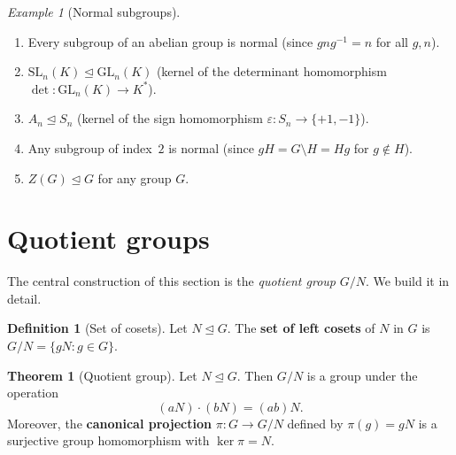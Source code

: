 \documentclass[12pt,a4paper,openany]{book}
\theoremstyle{definition}
\newtheorem{definition}{Definition}[chapter]
\newtheorem{theorem}{Theorem}[chapter]
\theoremstyle{remark}
\newtheorem{example}{Example}[chapter]
\begin{document}
\begin{example}[Normal subgroups]
\label{ex:normal-subgroups}
\begin{enumerate}[label=(\roman*)]
  \item Every subgroup of an abelian group is normal (since $gng^{-1}=n$
    for all $g,n$).
  \item $\text{SL}_n(K)\trianglelefteq\text{GL}_n(K)$ (kernel of the
    determinant homomorphism $\det\colon\text{GL}_n(K)\to K^*$).
  \item $A_n\trianglelefteq S_n$ (kernel of the sign homomorphism
    $\varepsilon\colon S_n\to\{+1,-1\}$).
  \item Any subgroup of index~$2$ is normal (since $gH=G\setminus H=Hg$
    for $g\notin H$).
  \item $Z(G)\trianglelefteq G$ for any group $G$.
\end{enumerate}
\end{example}

\section{Quotient groups}
\label{sec:ch2-quotient}

The central construction of this section is the \emph{quotient group}
$G/N$.  We build it in detail.

\begin{definition}[Set of cosets]
\label{def:coset-set}
Let $N\trianglelefteq G$.  The \textbf{set of left cosets} of $N$ in $G$ is
$G/N = \{gN : g\in G\}$.
\end{definition}

\begin{theorem}[Quotient group]
\label{thm:quotient-group}
Let $N\trianglelefteq G$.  Then $G/N$ is a group under the operation
\[
  (aN)\cdot(bN) = (ab)N.
\]
Moreover, the \textbf{canonical projection}
$\pi\colon G\to G/N$ defined by $\pi(g)=gN$ is a surjective group
homomorphism with $\ker\pi = N$.
\end{theorem}
\end{document}
